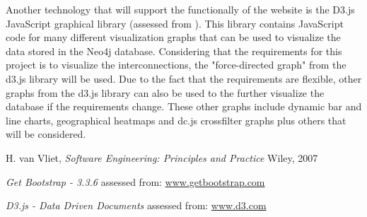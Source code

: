 \documentclass[10pt,onecolumn]{article}
\begin{document}
Another technology that will support the functionally of the website is the D3.js JavaScript graphical library (assessed from \cite{D3}). This library contains JavaScript code for many different visualization graphs that can be used to visualize the data stored in the Neo4j database. Considering that the requirements for this project is to visualize the interconnections, the "force-directed graph" from the d3.js library will be used. Due to the fact that the requirements are flexible, other graphs from the d3.js library can also be used to the further visualize the database if the requirements change. These other graphs include dynamic bar and line charts, geographical heatmaps and dc.js crossfilter graphs plus others that will be considered. 

\begin{thebibliography}{1}
	 H. van Vliet, \emph{Software Engineering: Principles
		and Practice} Wiley, 2007
	
	  \emph{Get Bootstrap - 3.3.6} assessed from: \url{www.getbootstrap.com}
	
	  \emph{D3.js - Data Driven Documents} assessed from: \url{www.d3.com}
	
	
\end{thebibliography}

\clearpage
\end{document}
